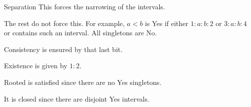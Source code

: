 \documentclass{beamer}
\begin{document}
\begin{frame}{Separation}
    This forces the narrowing of the intervals. 

    The rest do not force this. For example, $a<b$ is Yes if either $1:a:b:2$ or $3:a:b:4$ or contains such an interval. All singletons are No.

    Consistency is ensured by that last bit. 
    
    Existence is given by $1:2$. 

    Rooted is satisfied since there are no Yes singletons. 
    
    It is closed since there are disjoint Yes intervals. 
    
\end{frame}



%
%    
%    
\end{document}
